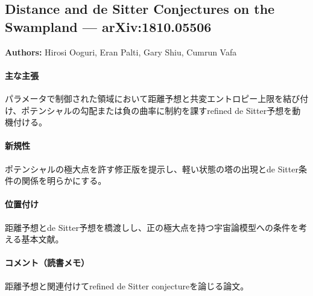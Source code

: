 \subsection{Distance and de Sitter Conjectures on the Swampland --- arXiv:1810.05506}

\textbf{Authors:} Hirosi Ooguri, Eran Palti, Gary Shiu, Cumrun Vafa

\paragraph{主な主張}
パラメータで制御された領域において距離予想と共変エントロピー上限を結び付け、ポテンシャルの勾配または負の曲率に制約を課すrefined de Sitter予想を動機付ける\cite{Ooguri:2018wrx}。

\paragraph{新規性}
ポテンシャルの極大点を許す修正版を提示し、軽い状態の塔の出現とde Sitter条件の関係を明らかにする。

\paragraph{位置付け}
距離予想とde Sitter予想を橋渡しし、正の極大点を持つ宇宙論模型への条件を考える基本文献。

\paragraph{コメント（読書メモ）}
距離予想と関連付けてrefined de Sitter conjectureを論じる論文。
